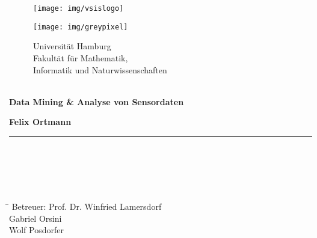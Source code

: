 \begin{titlepage}

  \setcounter{page}{-1}

	\begin{figure}[h]
		\begin{minipage}[b]{25mm}
			\texttt{[image: img/vsislogo]}
		\end{minipage}
		\begin{minipage}[b]{2mm}
			\texttt{[image: img/greypixel]}
		\end{minipage}
		\begin{minipage}[b]{12 cm}
			{\sffamily
				{\Large Universität Hamburg } \\
				Fakultät für Mathematik, \\
				Informatik und Naturwissenschaften \\
				\\
			}
		\end{minipage}
	\end{figure}

	\vfill
	
	\begin{center}
		\vspace{14mm}
		\noindent \textbf{\huge
		  Data Mining \& Analyse von Sensordaten\\
		}
		\vspace{60mm}	
	\end{center}
	
	\vfill
	
	\noindent \textbf{Felix Ortmann} \\
	\noindent \rule{\textwidth}{0.4mm} 
	 \\
	 \\
	 \\
	 \\
	\begin{tabbing}
	\hspace{8em} \=  \kill
	Betreuer: \> Prof. Dr. Winfried Lamersdorf \\
						\> Gabriel Orsini \\
						\> Wolf Posdorfer \\

	\end{tabbing}
	
	\setcounter{page}{0}
~

\end{titlepage}

